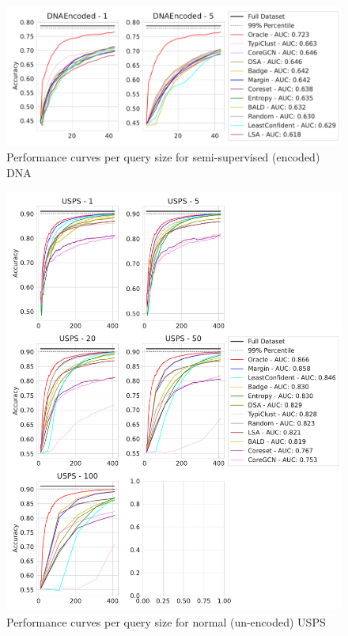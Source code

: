 \documentclass[]{article}
\begin{document}
\begin{figure}[H]
\centering
\caption{Performance curves per query size for semi-supervised (encoded) DNA}
\includegraphics[width=\linewidth]{img/eval_dna_enc} 
\end{figure}
\begin{figure}[H]
    \centering
    \caption{Performance curves per query size for normal (un-encoded) USPS}
	\includegraphics[width=\linewidth]{img/eval_usps}
\end{figure}
\end{document}
